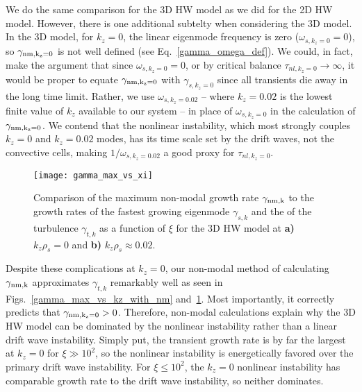 \documentclass[letter,scriptaddress,twocolumn, prl,showkeys]{revtex4}
\begin{document}
We do the same comparison for the 3D HW model as we did for the 2D HW model. However, there is one additional subtelty when considering the 3D model. In the 3D model, for $k_z=0$, the linear
eigenmode frequency is zero ($\omega_{s,k_z=0} = 0$), so $\gamma_{\rm{nm},k_z=0}$ is not well defined (see Eq.~\ref{gamma_omega_def}). 
We could, in fact, make the argument that since $\omega_{s,k_z=0} = 0$, or by critical balance $\tau_{nl,k_z=0} \to \infty$, it would be proper to equate $\gamma_{\rm{nm},k_z=0}$ with $\gamma_{s,k_z=0}$
since all transients die away in the long time limit. Rather, we use $\omega_{s,k_z=0.02}$ -- where $k_z=0.02$ is the lowest finite value of $k_z$ available to our system -- in place of
$\omega_{s,k_z=0}$ in the calculation of $\gamma_{\rm{nm},k_z=0}$. We contend that the nonlinear instability, which most strongly couples $k_z=0$ and $k_z=0.02$ modes, has its time scale set
by the drift waves, not the convective cells, making $1/\omega_{s,k_z=0.02}$ a good proxy for $\tau_{nl,k_z=0}$. 


\begin{figure}
\centerline{\texttt{[image: gamma\_max\_vs\_xi]}}
\caption{Comparison of the maximum non-modal growth rate $\gamma_{\rm{nm},k}$ to the growth rates of the fastest growing eigenmode $\gamma_{s,k}$ 
and the of the turbulence $\gamma_{t,k}$ as a function of $\xi$ for the 3D HW model at {\bf a)} $k_z \rho_s = 0$ and {\bf b)} $k_z \rho_s \approx 0.02$. }
\label{gamma_max_vs_xi}
\end{figure}

Despite these complications at $k_z=0$, our non-modal method of calculating $\gamma_{\rm{nm},k}$ approximates $\gamma_{t,k}$ remarkably well as seen in Figs.~\ref{gamma_max_vs_kz_with_nm}
and~\ref{gamma_max_vs_xi}. Most importantly, it correctly predicts that $\gamma_{\rm{nm},k_z=0} > 0$. 
Therefore, non-modal calculations explain why the 3D HW model can be dominated by the nonlinear instability rather than a linear drift wave instability. 
Simply put, the transient growth rate is by far the largest at $k_z=0$ for $\xi \gg 10^2$, so the nonlinear instability is energetically favored over the primary drift wave instability.
For $\xi \le 10^2$, the $k_z=0$ nonlinear instability has comparable growth rate to the drift wave instability, so neither dominates.
\end{document}
